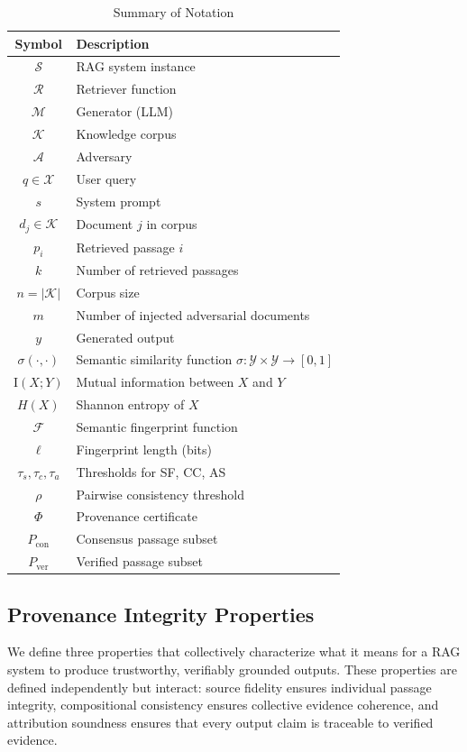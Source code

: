 \documentclass[journal,10pt]{IEEEtran}
\newcommand{\MI}{\mathrm{I}}
\newcommand{\calR}{\mathcal{R}}
\newcommand{\calM}{\mathcal{M}}
\newcommand{\calA}{\mathcal{A}}
\newcommand{\calS}{\mathcal{S}}
\newcommand{\calF}{\mathcal{F}}
\newcommand{\calK}{\mathcal{K}}
\newcommand{\calX}{\mathcal{X}}
\newcommand{\calY}{\mathcal{Y}}
\begin{document}
\begin{table}[t]
\centering
\caption{Summary of Notation}
\label{tab:notation}
\renewcommand{\arraystretch}{1.1}
\scriptsize
\begin{tabular}{@{}c l@{}}
\toprule
\textbf{Symbol} & \textbf{Description} \\
\midrule
$\calS$ & RAG system instance \\
$\calR$ & Retriever function \\
$\calM$ & Generator (LLM) \\
$\calK$ & Knowledge corpus \\
$\calA$ & Adversary \\
$q \in \calX$ & User query \\
$s$ & System prompt \\
$d_j \in \calK$ & Document $j$ in corpus \\
$p_i$ & Retrieved passage $i$ \\
$k$ & Number of retrieved passages \\
$n = |\calK|$ & Corpus size \\
$m$ & Number of injected adversarial documents \\
$y$ & Generated output \\
$\sigma(\cdot, \cdot)$ & Semantic similarity function $\sigma: \calY \times \calY \to [0,1]$ \\
$\MI(X; Y)$ & Mutual information between $X$ and $Y$ \\
$H(X)$ & Shannon entropy of $X$ \\
$\calF$ & Semantic fingerprint function \\
$\ell$ & Fingerprint length (bits) \\
$\tau_s, \tau_c, \tau_a$ & Thresholds for SF, CC, AS \\
$\rho$ & Pairwise consistency threshold \\
$\Phi$ & Provenance certificate \\
$P_{\text{con}}$ & Consensus passage subset \\
$P_{\text{ver}}$ & Verified passage subset \\
\bottomrule
\end{tabular}
\end{table}

\subsection{Provenance Integrity Properties}
We define three properties that collectively characterize what it means for a RAG system to produce trustworthy, verifiably grounded outputs. These properties are defined independently but interact: source fidelity ensures individual passage integrity, compositional consistency ensures collective evidence coherence, and attribution soundness ensures that every output claim is traceable to verified evidence.
\end{document}
